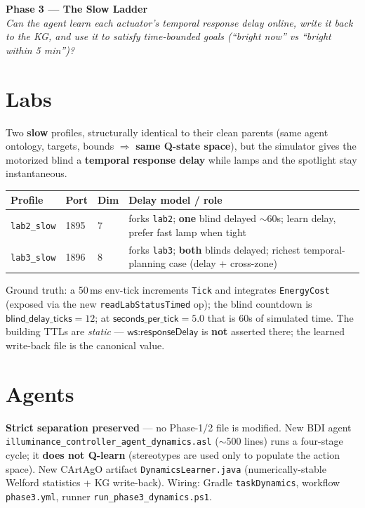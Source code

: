 \documentclass[10pt,a4paper]{article}
\newcommand{\file}[1]{\texttt{\small #1}}
\newcommand{\kw}[1]{\textbf{#1}}
\begin{document}
\clearpage
\begin{center}
  {\Large\bfseries Phase 3 — The Slow Ladder}\\[1pt]
  {\footnotesize \emph{Can the agent learn each actuator's temporal response delay online, write it back
  to the KG, and use it to satisfy time-bounded goals (``bright now'' vs ``bright within 5 min'')?}}
\end{center}
\vspace{-2pt}

\section{Labs}
Two \kw{slow} profiles, structurally identical to their clean parents (same agent ontology, targets,
bounds \(\Rightarrow\) \kw{same Q-state space}), but the simulator gives the motorized blind a
\kw{temporal response delay} while lamps and the spotlight stay instantaneous.

\begin{center}\footnotesize
\begin{tabular}{@{}lllp{6.2cm}@{}}
\toprule
\rowcolor{boxgrey} Profile & Port & Dim & Delay model / role\\
\midrule
\file{lab2\_slow} & 1895 & 7 & forks \file{lab2}; \kw{one} blind delayed \(\sim\!60\)s; learn delay, prefer fast lamp when tight\\
\file{lab3\_slow} & 1896 & 8 & forks \file{lab3}; \kw{both} blinds delayed; richest temporal-planning case (delay + cross-zone)\\
\bottomrule
\end{tabular}
\end{center}
Ground truth: a 50\,ms env-tick increments \texttt{Tick} and integrates \texttt{EnergyCost} (exposed via the
new \file{readLabStatusTimed} op); the blind countdown is \(\textsf{blind\_delay\_ticks}=12\); at
\(\textsf{seconds\_per\_tick}=5.0\) that is \(60\)s of simulated time. The building TTLs are \emph{static} —
\(\textsf{ws:responseDelay}\) is \kw{not} asserted there; the learned write-back file is the canonical value.

\section{Agents}
\kw{Strict separation preserved} — no Phase-1/2 file is modified. New BDI agent
\file{illuminance\_controller\_agent\_dynamics.asl} (\(\sim\)500 lines) runs a four-stage cycle; it
\kw{does not Q-learn} (stereotypes are used only to populate the action space). New CArtAgO artifact
\file{DynamicsLearner.java} (numerically-stable Welford statistics + KG write-back). Wiring: Gradle
\file{taskDynamics}, workflow \file{phase3.yml}, runner \file{run\_phase3\_dynamics.ps1}.
\end{document}
